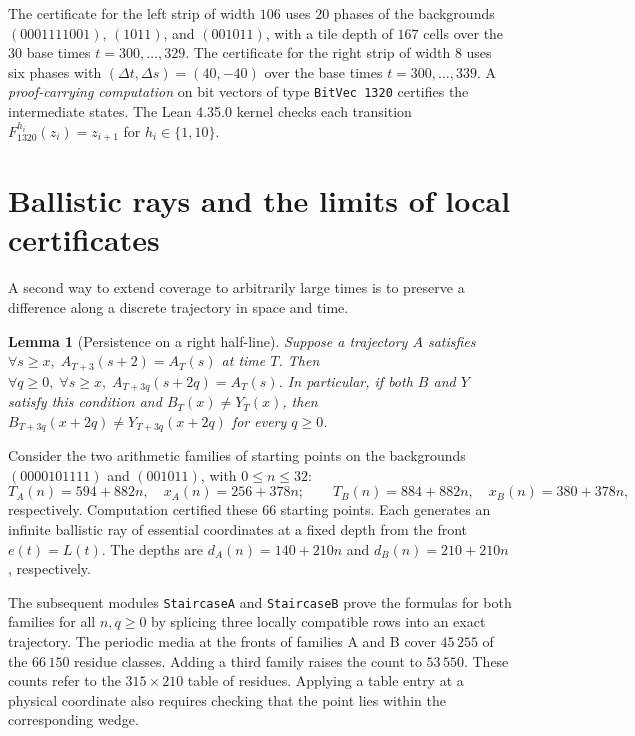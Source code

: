 \documentclass[11pt, a4paper]{article}
\newtheorem{lemma}[theorem]{Lemma}
\begin{document}
The certificate for the left strip of width $106$ uses $20$ phases of the backgrounds $(0001111001)$, $(1011)$, and $(001011)$, with a tile depth of $167$ cells over the $30$ base times $t = 300, \dots, 329$. The certificate for the right strip of width $8$ uses six phases with $(\Delta t, \Delta s) = (40,-40)$ over the base times $t = 300, \dots, 339$. A \emph{proof-carrying computation} on bit vectors of type \texttt{BitVec 1320} certifies the intermediate states. The Lean 4.35.0 kernel checks each transition $F_{1320}^{h_i}(z_i) = z_{i+1}$ for $h_i \in \{1, 10\}$.

\section{Ballistic rays and the limits of local certificates}

A second way to extend coverage to arbitrarily large times is to preserve a difference along a discrete trajectory in space and time.

\begin{lemma}[Persistence on a right half-line]\label{lem:ballistic_ray}
Suppose a trajectory $A$ satisfies $\forall s \ge x,\; A_{T+3}(s + 2) = A_T(s)$ at time $T$. Then $\forall q \ge 0,\; \forall s \ge x,\; A_{T+3q}(s + 2q) = A_T(s)$. In particular, if both $B$ and $Y$ satisfy this condition and $B_T(x) \ne Y_T(x)$, then $B_{T+3q}(x + 2q) \ne Y_{T+3q}(x + 2q)$ for every $q \ge 0$.
\end{lemma}

Consider the two arithmetic families of starting points on the backgrounds $(0000101111)$ and $(001011)$, with $0 \le n \le 32$:
\begin{equation}
T_A(n) = 594 + 882n,\quad x_A(n) = 256 + 378n; \qquad
T_B(n) = 884 + 882n,\quad x_B(n) = 380 + 378n,
\end{equation}
respectively. Computation certified these $66$ starting points. Each generates an infinite ballistic ray of essential coordinates at a fixed depth from the front $e(t) = L(t)$. The depths are $d_A(n) = 140 + 210n$ and $d_B(n) = 210 + 210n$, respectively.

The subsequent modules \texttt{StaircaseA} and \texttt{StaircaseB} prove the formulas for both families for all $n,q\ge0$ by splicing three locally compatible rows into an exact trajectory. The periodic media at the fronts of families A and B cover $45\,255$ of the $66\,150$ residue classes. Adding a third family raises the count to $53\,550$. These counts refer to the $315\times210$ table of residues. Applying a table entry at a physical coordinate also requires checking that the point lies within the corresponding wedge.
\end{document}
